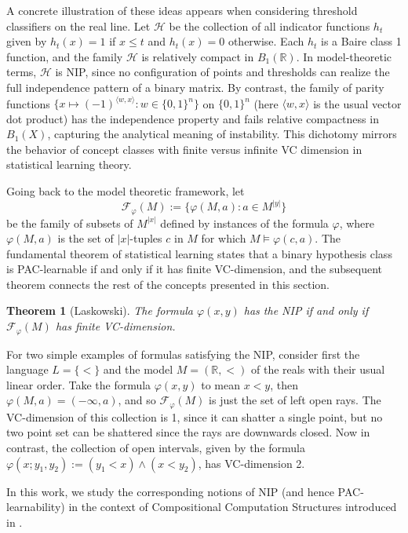 \documentclass[psamsfonts]{amsart}
\newtheorem{thm}{Theorem}[section]
\theoremstyle{definition}
\theoremstyle{remark}
\numberwithin{equation}{section}
\begin{document}
A concrete illustration of these ideas appears when considering threshold classifiers on the real line. Let $\mathcal{H}$ be the collection of all indicator functions $h_t$ given by $h_t(x)=1$ if $x\leq t$ and $h_t(x)=0$ otherwise. Each $h_t$ is a Baire class 1 function, and the family $\mathcal{H}$ is relatively compact in $B_1(\mathbb{R})$. In model-theoretic terms, $\mathcal{H}$ is NIP, since no configuration of points and thresholds can realize the full independence pattern of a binary matrix. By contrast, the family of parity functions $\{x\mapsto (-1)^{\langle w,x\rangle}:w\in\{0,1\}^n\}$ on $\{0,1\}^n$ (here ${\langle w,x\rangle}$ is the usual vector dot product) has the independence property and fails relative compactness in $B_1(X)$, capturing the analytical meaning of instability. This dichotomy mirrors the behavior of concept classes with finite versus infinite VC dimension in statistical learning theory.

Going back to the model theoretic framework, let $$\mathcal F_\varphi(M):=\{\varphi(M,a):a\in M^{|y|}\}$$ be the family of subsets of $M^{|x|}$ defined by instances of the formula $\varphi$, where $\varphi(M,a)$ is the set of $|x|$-tuples $c$ in $M$ for which $M\models \varphi(c,a)$. The fundamental theorem of statistical learning states that a binary hypothesis class is PAC-learnable if and only if it has finite VC-dimension, and the subsequent theorem connects the rest of the concepts presented in this section.

\begin{thm}[Laskowski]
    The formula $\varphi(x,y)$ has the NIP if and only if $\mathcal F_\varphi(M)$ has finite VC-dimension.
\end{thm}

For two simple examples of formulas satisfying the NIP, consider first the language $L=\{<\}$ and the model $M=(\mathbb R,<)$ of the reals with their usual linear order. Take the formula $\varphi(x,y)$ to mean $x<y$, then $\varphi(M,a)=(-\infty,a)$, and so $\mathcal F_\varphi(M)$ is just the set of left open rays. The VC-dimension of this collection is 1, since it can shatter a single point, but no two point set can be shattered since the rays are downwards closed. Now in contrast, the collection of open intervals, given by the formula $\varphi(x;y_1,y_2):=(y_1<x)\land(x<y_2)$, has VC-dimension 2.

In this work, we study the corresponding notions of NIP (and hence PAC-learnability) in the context of Compositional Computation Structures introduced in \cite{alva2024approximability}.
\end{document}
